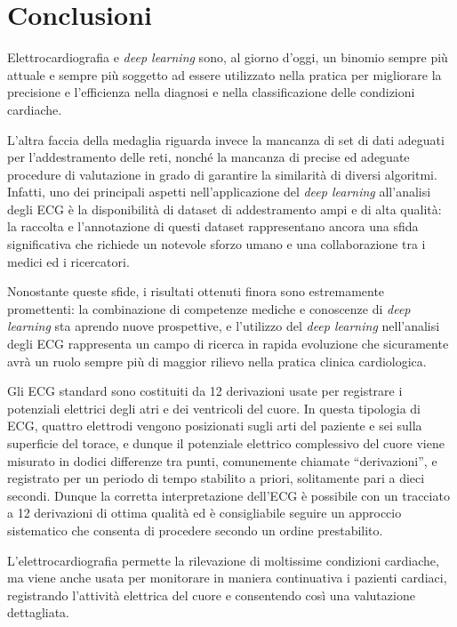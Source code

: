 \documentclass[12pt,italian]{report}
\begin{document}
\chapter{Conclusioni}
\label{chap:conclusioni}

Elettrocardiografia e \textit{deep learning} sono, al giorno d'oggi, un binomio sempre più attuale e sempre più soggetto ad essere utilizzato nella pratica per migliorare la precisione e l'efficienza nella diagnosi e nella classificazione delle condizioni cardiache.

L'altra faccia della medaglia riguarda invece la mancanza di set di dati adeguati per l'addestramento delle reti, nonché la mancanza di precise ed adeguate procedure di valutazione in grado di garantire la similarità di diversi algoritmi. Infatti, uno dei principali aspetti nell'applicazione del \textit{deep learning} all'analisi degli ECG è la disponibilità di dataset di addestramento ampi e di alta qualità: la raccolta e l'annotazione di questi dataset rappresentano ancora una sfida significativa che richiede un notevole sforzo umano e una collaborazione tra i medici ed i ricercatori.

Nonostante queste sfide, i risultati ottenuti finora sono estremamente promettenti: la combinazione di competenze mediche e conoscenze di \textit{deep learning} sta aprendo nuove prospettive, e l'utilizzo del \textit{deep learning} nell'analisi degli ECG rappresenta un campo di ricerca in rapida evoluzione che sicuramente avrà un ruolo sempre più di maggior rilievo nella pratica clinica cardiologica.

Gli ECG standard sono costituiti da 12 derivazioni usate per registrare i potenziali elettrici degli atri e dei ventricoli del cuore. In questa tipologia di ECG, quattro elettrodi vengono posizionati sugli arti del paziente e sei sulla superficie del torace, e dunque il potenziale elettrico complessivo del cuore viene misurato in dodici differenze tra punti, comunemente chiamate ``derivazioni'', e registrato per un periodo di tempo stabilito a priori, solitamente pari a dieci secondi. Dunque la corretta interpretazione dell'ECG è possibile con un tracciato a 12 derivazioni di ottima qualità ed è consigliabile seguire un approccio sistematico che consenta di procedere secondo un ordine prestabilito.

L'elettrocardiografia permette la rilevazione di moltissime condizioni cardiache, ma viene anche usata per monitorare in maniera continuativa i pazienti cardiaci, registrando l'attività elettrica del cuore e consentendo così una valutazione dettagliata.
\end{document}
